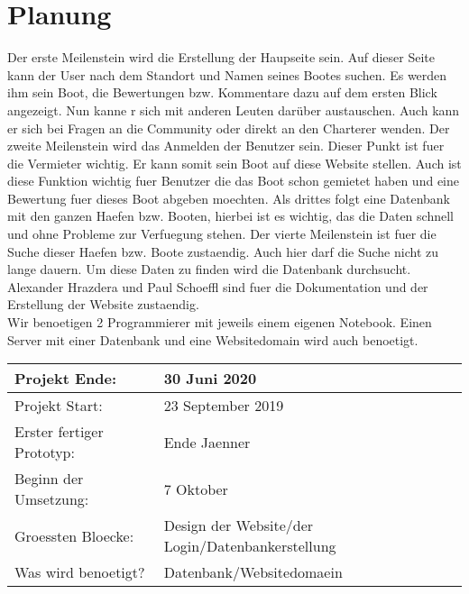 \documentclass[12pt]{article}
\theoremstyle{definition}
\begin{document}
\pagebreak
\section{Planung}
\begin{article}
Der erste Meilenstein wird die Erstellung der Haupseite sein. Auf dieser Seite kann der User nach dem Standort und Namen seines Bootes suchen. Es werden ihm sein Boot, die Bewertungen bzw. Kommentare dazu auf dem ersten Blick angezeigt. Nun kanne r sich mit anderen Leuten darüber austauschen. Auch kann er sich bei Fragen an die Community oder direkt an den Charterer wenden. 
Der zweite Meilenstein wird das Anmelden der Benutzer sein. Dieser Punkt ist fuer die Vermieter wichtig. Er kann somit sein Boot auf diese Website stellen. Auch ist diese Funktion wichtig fuer Benutzer die das Boot schon gemietet haben und eine Bewertung fuer dieses Boot abgeben moechten.
Als drittes folgt eine Datenbank mit den ganzen Haefen bzw. Booten, hierbei ist es wichtig, das die Daten schnell und ohne Probleme zur Verfuegung stehen. Der vierte Meilenstein ist fuer die Suche dieser Haefen bzw. Boote zustaendig. Auch hier darf die Suche nicht zu lange dauern. Um diese Daten zu finden wird die Datenbank durchsucht.\\ Alexander Hrazdera und Paul Schoeffl sind fuer die Dokumentation und der Erstellung der Website zustaendig.\\ Wir benoetigen 2 Programmierer mit jeweils einem eigenen Notebook. Einen Server mit einer Datenbank und eine Websitedomain wird auch benoetigt.
\end{article} 

\newcommand{\projektend}{30 Juni 2020}
\newcommand{\projectstart}{23 September 2019}
\newcommand{\firstresult}{Ende Jaenner}
\newcommand{\beginofprog}{7 Oktober}
\newcommand{\bigBlocks}{Design der Website/der Login/Datenbankerstellung}
\newcommand{\whatisneeded}{Datenbank/Websitedomaein}

\begin{flushleft} 
\begin{tabular}{|l|l|}
\hline
Projekt Ende: & \projektend \\ \hline
Projekt Start: & \projectstart \\ \hline
Erster fertiger Prototyp: & \firstresult \\ \hline
Beginn der Umsetzung: & \beginofprog \\ \hline
Groessten Bloecke: & \bigBlocks \\ \hline
Was wird benoetigt? & \whatisneeded \\ \hline
\end{tabular}
\end{flushleft}
\end{document}
